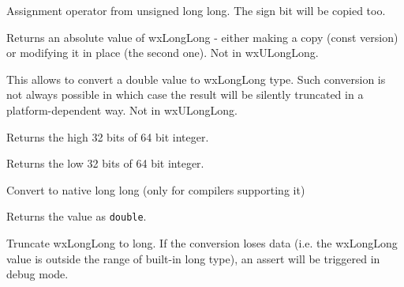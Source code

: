 Assignment operator from unsigned long long. The sign bit will be copied too.


\label{wxlonglongabs}



Returns an absolute value of wxLongLong - either making a copy (const version)
or modifying it in place (the second one).  Not in wxULongLong.


\label{wxlonglongassign}


This allows to convert a double value to wxLongLong type. Such conversion is
not always possible in which case the result will be silently truncated in a
platform-dependent way.  Not in wxULongLong.


\label{wxlonglonggethi}


Returns the high 32 bits of 64 bit integer.


\label{wxlonglonggetlo}


Returns the low 32 bits of 64 bit integer.


\label{wxlonglonggetvalue}


Convert to native long long (only for compilers supporting it)


\label{wxlonglonggetdouble}


Returns the value as \texttt{double}.


\label{wxlonglongtolong}


Truncate wxLongLong to long. If the conversion loses data (i.e. the wxLongLong
value is outside the range of built-in long type), an assert will be triggered
in debug mode.


\label{wxlonglongtostring}

